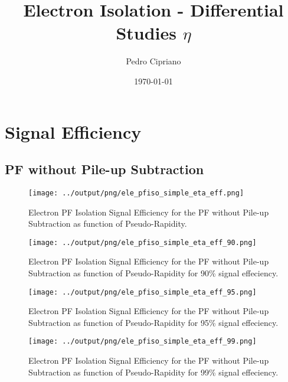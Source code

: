 \documentclass[11pt]{book}
\begin{document}
         
 
 \author{Pedro Cipriano}
 \date{\today}
 \title{Electron Isolation - Differential Studies $\eta$}

\maketitle

\tableofcontents

\chapter{Signal Efficiency}
\section{PF without Pile-up Subtraction}
\begin{figure}[htb]
\centering
\texttt{[image: ../output/png/ele\_pfiso\_simple\_eta\_eff.png]}
\caption{Electron PF Isolation Signal Efficiency for the PF without Pile-up Subtraction as function of Pseudo-Rapidity.}
\label{fig:ele_pfiso_eta_eff_simple}
\end{figure}

\begin{figure}[htb]
\centering
\texttt{[image: ../output/png/ele\_pfiso\_simple\_eta\_eff\_90.png]}
\caption{Electron PF Isolation Signal Efficiency for the PF without Pile-up Subtraction as function of Pseudo-Rapidity for 90\% signal effeciency.}
\label{fig:ele_pfiso_eta_eff_simple_eff_90}
\end{figure}

\begin{figure}[htb]
\centering
\texttt{[image: ../output/png/ele\_pfiso\_simple\_eta\_eff\_95.png]}
\caption{Electron PF Isolation Signal Efficiency for the PF without Pile-up Subtraction as function of Pseudo-Rapidity for 95\% signal effeciency.}
\label{fig:ele_pfiso_eta_eff_simple_eff_95}
\end{figure}

\begin{figure}[htb]
\centering
\texttt{[image: ../output/png/ele\_pfiso\_simple\_eta\_eff\_99.png]}
\caption{Electron PF Isolation Signal Efficiency for the PF without Pile-up Subtraction as function of Pseudo-Rapidity for 99\% signal effeciency.}
\label{fig:ele_pfiso_eta_eff_simple_eff_99}
\end{figure}
\end{document}
